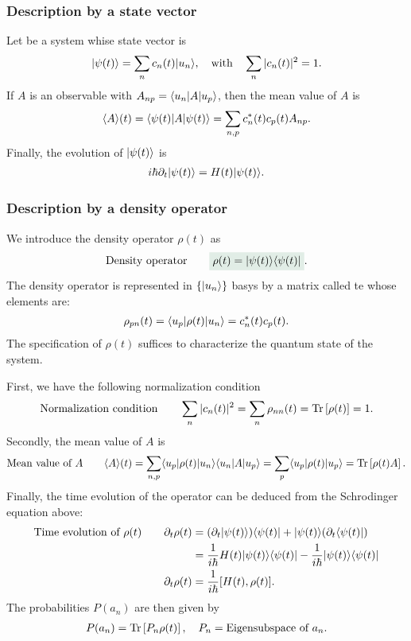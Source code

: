 \subsubsection{Description by a state vector}
Let be a system whise state vector is 
\begin{align*}
    |\psi(t)\rangle=\sum_nc_n(t)|u_n\rangle,\quad\text{with}\quad\sum_n|c_n(t)|^2=1.
\end{align*}
If $A$ is an observable with $A_{np}=\langle u_n|A|u_p\rangle$, then the mean value of $A$ is
\begin{align*}
    \langle A\rangle(t)=\langle\psi(t)|A|\psi(t)\rangle=\sum_{n,p}c_n^*(t)c_p(t)A_{np}.
\end{align*}
Finally, the evolution of $|\psi(t)\rangle$ is 
\begin{align*}
    i\hbar\partial_t|\psi(t)\rangle=H(t)|\psi(t)\rangle.
\end{align*}
\subsubsection{Description by a density operator}
We introduce the density operator $\rho(t)$ as 
\begin{align}
    \text{Density operator}\qquad\highlight{\rho(t)=\ket{\psi(t)}\bra{\psi(t)}}.
    \label{eq:densityoperator}
\end{align}
The density operator is represented in $\{|u_n\rangle\}$ basys by a matrix called te  whose elements are:
\begin{align*}
    \rho_{pn}(t)=\langle u_p|\rho(t)|u_n\rangle=c_n^*(t)c_p(t).
\end{align*}
The specification of $\rho(t)$ suffices to characterize the quantum state of the system. 

First, we have the following normalization condition
\begin{align*}
    \text{Normalization condition}\qquad\sum_n|c_n(t)|^2=\sum_n\rho_{nn}(t)=\text{Tr}\left[\rho(t)\right]=1.
\end{align*}
Secondly, the mean value of $A$ is 
\begin{align*}
    \text{Mean value of $A$}\qquad\langle A\rangle(t)=\sum_{n,p}\langle u_p|\rho(t)|u_n\rangle\langle u_n|A|u_p\rangle=\sum_p\langle u_p|\rho(t)|u_p\rangle=\text{Tr}\left[\rho(t)A\right].
\end{align*}
Finally, the time evolution of the operator can be deduced from the Schrodinger equation above:
\begin{align}
    \text{Time evolution of $\rho(t)$}\qquad \partial_t\rho(t)&=(\partial_t|\psi(t)\rangle)\langle\psi(t)|+|\psi(t)\rangle(\partial_t\langle\psi(t)|)\notag\\
    &=\frac{1}{i\hbar}H(t)|\psi(t)\rangle\langle\psi(t)|-\frac{1}{i\hbar}|\psi(t)\rangle\langle\psi(t)|\notag\\
    \partial_t\rho(t)&=\frac{1}{i\hbar}[H(t),\rho(t)].\label{eq:timeevolution_purecase}
\end{align}
The probabilities $P(a_n)$ are then given by  
\begin{align*}
    P(a_n)=\text{Tr}\left[P_n\rho(t)\right],\quad P_n=\text{Eigensubspace of $a_n$}.
\end{align*}

